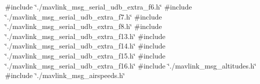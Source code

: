 {\ttfamily \#include \char`\"{}./mavlink\+\_\+msg\+\_\+serial\+\_\+udb\+\_\+extra\+\_\+f6.\+h\char`\"{}}\newline
{\ttfamily \#include \char`\"{}./mavlink\+\_\+msg\+\_\+serial\+\_\+udb\+\_\+extra\+\_\+f7.\+h\char`\"{}}\newline
{\ttfamily \#include \char`\"{}./mavlink\+\_\+msg\+\_\+serial\+\_\+udb\+\_\+extra\+\_\+f8.\+h\char`\"{}}\newline
{\ttfamily \#include \char`\"{}./mavlink\+\_\+msg\+\_\+serial\+\_\+udb\+\_\+extra\+\_\+f13.\+h\char`\"{}}\newline
{\ttfamily \#include \char`\"{}./mavlink\+\_\+msg\+\_\+serial\+\_\+udb\+\_\+extra\+\_\+f14.\+h\char`\"{}}\newline
{\ttfamily \#include \char`\"{}./mavlink\+\_\+msg\+\_\+serial\+\_\+udb\+\_\+extra\+\_\+f15.\+h\char`\"{}}\newline
{\ttfamily \#include \char`\"{}./mavlink\+\_\+msg\+\_\+serial\+\_\+udb\+\_\+extra\+\_\+f16.\+h\char`\"{}}\newline
{\ttfamily \#include \char`\"{}./mavlink\+\_\+msg\+\_\+altitudes.\+h\char`\"{}}\newline
{\ttfamily \#include \char`\"{}./mavlink\+\_\+msg\+\_\+airspeeds.\+h\char`\"{}}\newline
